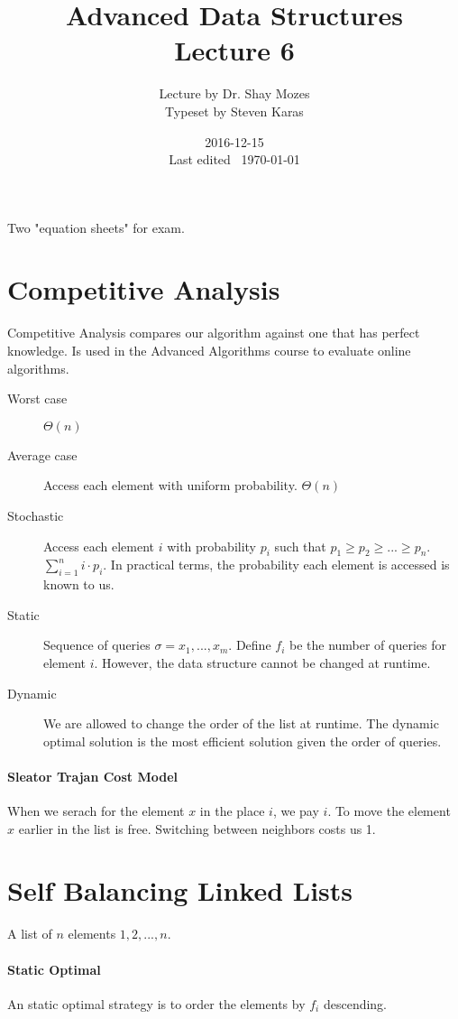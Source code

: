 \documentclass[a4paper]{article}
\title{Advanced Data Structures\\\large Lecture 6}
\date{2016-12-15 \\ Last edited \currenttime\ \today}
\author{Lecture by Dr. Shay Mozes\\Typeset by Steven Karas}
\begin{document}
\maketitle

Two "equation sheets" for exam.

\section{Competitive Analysis}
Competitive Analysis compares our algorithm against one that has perfect knowledge. Is used in the Advanced Algorithms course to evaluate online algorithms.

\begin{description}
  \item[Worst case] $\Theta(n)$
  \item[Average case] Access each element with uniform probability. $\Theta(n)$
  \item[Stochastic] Access each element $i$ with probability $p_i$ such that $p_1 \ge p_2 \ge ... \ge p_n$. $\sum_{i=1}^n i\cdot p_i$. In practical terms, the probability each element is accessed is known to us.
  \item[Static] Sequence of queries $\sigma=x_1,...,x_m$. Define $f_i$ be the number of queries for element $i$. However, the data structure cannot be changed at runtime.
  \item[Dynamic] We are allowed to change the order of the list at runtime. The dynamic optimal solution is the most efficient solution given the order of queries.
\end{description}

\paragraph{Sleator Trajan Cost Model}
When we serach for the element $x$ in the place $i$, we pay $i$.
To move the element $x$ earlier in the list is free.
Switching between neighbors costs us 1.

\section{Self Balancing Linked Lists}
A list of $n$ elements $1,2,...,n$. 

\paragraph{Static Optimal}
An static optimal strategy is to order the elements by $f_i$ descending.
\end{document}

